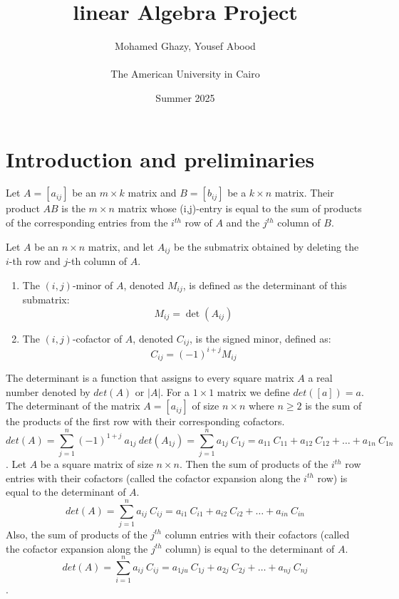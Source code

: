 \documentclass{article}
\title{linear Algebra Project}
\author{Mohamed Ghazy, Yousef Abood  \\ ~ \\ The American University in Cairo \\}
\date{Summer 2025}
\begin{document}
\maketitle

\section{Introduction and preliminaries}
{
Let $A=[a_{ij}]$ be an $m \times k$ matrix and $B=[b_{ij}]$ be a $k \times n$ matrix. Their product $AB$ is the $m \times n$ matrix whose (i,j)-entry is equal to the sum of products of the corresponding entries from the $i^{th}$ row of $A$ and the $j^{th}$ column of $B.$
}

{
Let $A$ be an $n \times n$ matrix, and let $A_{ij}$ be the submatrix obtained by deleting the $i$-th row and $j$-th column of $A$.

\begin{enumerate}
    \item The {$(i,j)$-minor} of $A$, denoted $M_{ij}$, is defined as the determinant of this submatrix:
    \[
        M_{ij} = \det(A_{ij})
    \]

    \item The {$(i,j)$-cofactor} of $A$, denoted $C_{ij}$, is the signed minor, defined as:
    \[
        C_{ij} = (-1)^{i+j} M_{ij}
    \]
\end{enumerate}
}


{
The determinant is a function that assigns to every square matrix $A$ a real number denoted by $det(A)$ or $|A|$. For a $1 \times 1$ matrix we define $det([a])=a.$ The determinant of the matrix $A=[a_{ij}]$ of size $n \times n$ where $n \geq 2$ is the sum of the products of the first row with their corresponding cofactors.
\[det(A)=\sum_{j=1}^{n} (-1)^{1+j}\ a_{1j} \ det(A_{1j})=\sum_{j=1}^{n} a_{1j}\ C_{1j}= a_{11}\ C_{11}+ a_{12}\ C_{12}+\dots + a_{1n}\ C_{1n}\].
}
\thm{}
{
Let $A$ be a square matrix of size $n\times n$. Then the sum of products of the $i^{th}$ row
entries with their cofactors (called the cofactor expansion along the $i^{th}$ row) is
equal to the determinant of $A$.
\[det(A)=\sum_{j=1}^{n} a_{ij}\ C_{ij}= a_{i1}\ C_{i1}+ a_{i2}\ C_{i2}+\dots + a_{in}\ C_{in}\]
Also, the sum of products of the $j^{th}$ column entries with their cofactors (called
the cofactor expansion along the $j^{th}$ column) is equal to the determinant of $A$.
\[det(A)=\sum_{i=1}^{n} a_{ij}\ C_{ij}= a_{1ju}\ C_{1j}+ a_{2j}\ C_{2j}+\dots + a_{nj}\ C_{nj}\].
}
\end{document}
